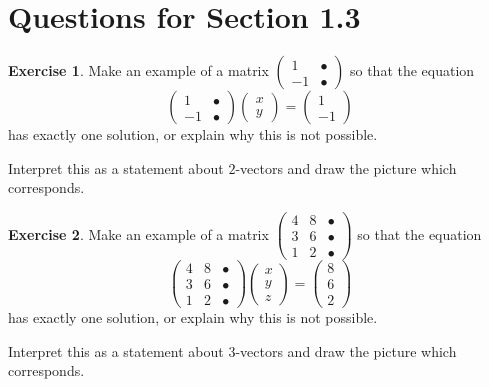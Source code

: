\documentclass[11pt]{amsart}
\theoremstyle{definition}
\newtheorem{exercise}{Exercise}
\begin{document}
\section{Questions for Section 1.3}
\setcounter{exercise}{24}

\begin{exercise}
Make an example of a matrix $\left(\begin{smallmatrix} 1 & \bullet \\ -1 & \bullet \end{smallmatrix}\right)$ so that the equation
\[
\begin{pmatrix} 1 & \bullet \\ -1 & \bullet \end{pmatrix} \begin{pmatrix} x \\ y \end{pmatrix} = \begin{pmatrix} 1 \\ -1 \end{pmatrix}
\]
has exactly one solution, or explain why this is not possible.

Interpret this as a statement about $2$-vectors and draw the picture which corresponds.
\end{exercise}

\vspace{1cm}

\begin{exercise}
Make an example of a matrix $\left(\begin{smallmatrix} 4 & 8 & \bullet \\ 3 & 6 & \bullet \\ 1 & 2 & \bullet \end{smallmatrix}\right)$ so that the equation
\[
\begin{pmatrix} 4 & 8 & \bullet \\ 3 & 6 & \bullet \\ 1 & 2 & \bullet \end{pmatrix} \begin{pmatrix} x \\ y \\ z \end{pmatrix} = \begin{pmatrix} 8 \\ 6 \\ 2 \end{pmatrix}
\]
has exactly one solution, or explain why this is not possible.

Interpret this as a statement about $3$-vectors and draw the picture which corresponds.
\end{exercise}
\end{document}
